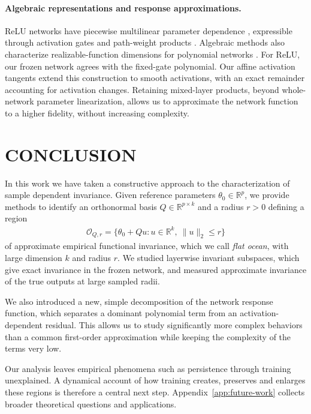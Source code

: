 \documentclass[twoside]{article}
\theoremstyle{remark}
\theoremstyle{highlightdefinition}
\theoremstyle{remark}
\begin{document}
\paragraph{Algebraic representations and response approximations.}
ReLU networks have piecewise multilinear parameter dependence \citep{laurent2018multilinear}, expressible through activation gates and path-weight products \citep{lakshminarayanan2020paths}. Algebraic methods also characterize realizable-function dimensions for polynomial networks \citep{kileel2019expressive}. For ReLU, our frozen network agrees with the fixed-gate polynomial. Our affine activation tangents extend this construction to smooth activations, with an exact remainder accounting for activation changes. Retaining mixed-layer products, beyond whole-network parameter linearization, allows us to approximate the network function to a higher fidelity, without increasing complexity.

\section{CONCLUSION}
\label{sec:conclusion}
In this work we have taken a constructive approach to the characterization of sample dependent invariance. Given reference parameters $\theta_0\in\mathbb R^p$, we provide methods to identify an orthonormal basis $Q\in\mathbb R^{p\times k}$ and a radius $r>0$ defining a region
\begin{align*}
\mathcal O_{Q,r}=\{\theta_0+Qu:u\in\mathbb R^k,\ \|u\|_2\le r\}
\end{align*}
of approximate empirical functional invariance, which we call \emph{flat ocean}, with large dimension $k$ and radius $r$. We studied layerwise invariant subspaces, which give exact invariance in the frozen network, and measured approximate invariance of the true outputs at large sampled radii.

We also introduced a new, simple decomposition of the network response function, which separates a dominant polynomial term from an activation-dependent residual. This allows us to study significantly more complex behaviors than a common first-order approximation while keeping the complexity of the terms very low. 

Our analysis leaves empirical phenomena such as persistence through training unexplained. A dynamical account of how training creates, preserves and enlarges these regions is therefore a central next step. Appendix~\ref{app:future-work} collects broader theoretical questions and applications.
\end{document}
